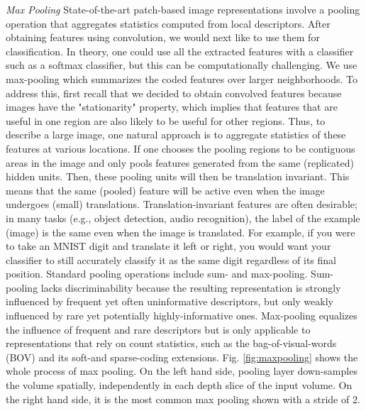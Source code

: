 \documentclass[authoryear,preprint,revi	ew,12pt]{elsarticle}
\begin{document}
\textit{Max Pooling} 
State-of-the-art patch-based image representations involve a pooling operation that aggregates statistics computed from local descriptors. After obtaining features using convolution, we would next like to use them for classification. In theory, one could use all the extracted features with a classifier such as a softmax classifier, but this can be computationally challenging. We use max-pooling which summarizes the coded features over larger neighborhoods. To address this, first recall that we decided to obtain convolved features because images have the "stationarity" property, which implies that features that are useful in one region are also likely to be useful for other regions. Thus, to describe a large image, one natural approach is to aggregate statistics of these features at various locations. If one chooses the pooling regions to be contiguous areas in the image and only pools features generated from the same (replicated) hidden units. Then, these pooling units will then be translation invariant. This means that the same (pooled) feature will be active even when the image undergoes (small) translations. Translation-invariant features are often desirable; in many tasks (e.g., object detection, audio recognition), the label of the example (image) is the same even when the image is translated. For example, if you were to take an MNIST digit and translate it left or right, you would want your classifier to still accurately classify it as the same digit regardless of its final position. Standard pooling operations include sum- and max-pooling. Sum-pooling lacks discriminability because the resulting representation is strongly influenced by frequent yet often uninformative descriptors, but only weakly influenced by rare yet potentially highly-informative ones. Max-pooling equalizes the influence of frequent and rare descriptors but is only applicable to representations that rely on count statistics, such as the bag-of-visual-words (BOV) and its soft-and sparse-coding extensions. Fig. \ref{fig:maxpooling} shows the whole process of max pooling. On the left hand side, pooling layer down-samples the volume spatially, independently in each depth slice of the input volume. On the right hand side, it is the most common max pooling shown with a stride of 2.
\end{document}
